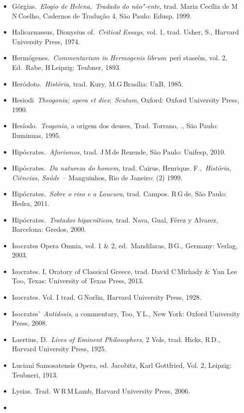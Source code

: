 \begin{itemize}
  [Hrsg] Hamburg: Verlag, 1989.
\item
  Górgias.~\emph{Elogio de Helena},~\emph{Tradado do não"-ente}, trad.
  Maria Cecília de M\,N\,Coelho, Cadernos de Tradução 4, São Paulo:
  Edusp, 1999.
\item
  Halicarnassus, Dionysius of.~\emph{Critical Essays}, vol. 1, trad.
  Usher, S., Harvard University Press, 1974.
\item
  Hermógenes.~\emph{Commentarium in Hermogenis librum}~perì staseôn,
  vol. 2, Ed.~Rabe, H\,Leipzig: Teubner, 1893.
\item
  Heródoto.~\emph{História}, trad. Kury, M.G\,Brasília: UnB, 1985.
\item
  Hesiodi~\emph{Theogonia; opera et dies};~\emph{Scutum}, Oxford: Oxford
  University Press, 1990.
\item
  Hesíodo.~\emph{Teogonia}, a origem dos deuses, Trad. Torrano, .,
  São Paulo: Iluminuas, 1995.
\item
  Hipócrates.~\emph{Aforismos}, trad. J\,M\,de Rezende, São Paulo:
  Unifesp, 2010.
\item
  Hipócrates.~\emph{Da natureza do homem}, trad. Cairus, Henrique.
  F.,~\emph{História, Ciências, Saúde}~-- Manguinhos, Rio de Janeiro: 
  (2) 1999.
\item
  Hipócrates.~\emph{Sobre o riso e a Loucura}, trad. Campos. R\,G\,de,
  São Paulo: Hedra, 2011.
\item
  Hipócrates.~\emph{Tratados hipocráticos}, trad. Nava, Gual, Férez y
  Alvarez, Barcelona: Gredos, 2000.
\item
  Isocrates Opera Omnia, vol. 1 \& 2, ed.~Mandilaras, B\,G., Germany:
  Verlag, 2003.
\item
  Isocrates. I, Oratory of Classical Greece, trad. David C\,Mirhady \&
  Yun Lee Too, Texas: University of Texas Press, 2013.
\item
  Isocrates. Vol. I trad. G\,Norlin, Harvard University Press, 1928.
\item
  Isocrates'~\emph{Antidosis}, a commentary, Too, Y\,L., New York:
  Oxford University Press, 2008.
\item
  Laertius, D.~\emph{Lives of Eminent Philosophers}, 2 Vols, trad.
  Hicks, R\,D., Harvard University Press, 1925.
\item
  Luciani Samosatensis Opera, ed. Jacobitz, Karl Gottfried, Vol. 2,
  Leipzig: Teubneri, 1913.
\item
  Lysias. Trad. W\,R\,M\,Lamb, Harvard University Press, 2006.
\item

\end{itemize}
